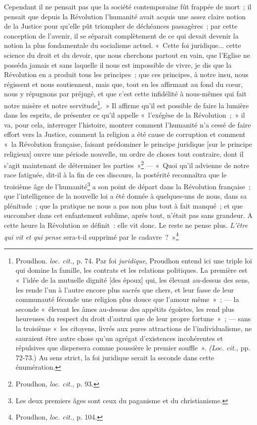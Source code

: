\documentclass[french,twoside]{book} %
\begin{document}
Cependant il ne pensait pas que la société contemporaine fût frappée de mort ; il pensait que depuis la Révolution l’humanité avait acquis une assez claire notion de la Justice pour qu’elle pût triompher de déchéances passagères ; par cette conception de l’avenir, il se séparait complètement de ce qui devait devenir la notion la plus fondamentale du socialisme actuel. « Cette foi juridique... cette science du droit et du devoir, que nous cherchons partout en vain, que l’Eglise ne posséda jamais et sans laquelle il nous est impossible de vivre, je dis que la Révolution en a produit tous les principes ; que ces principes, à notre insu, nous régissent et nous soutiennent, mais que, tout en les affirmant au fond du cœur, nous y  répugnons par préjugé, et que c’est cette infidélité à nous-mêmes qui fait notre misère et notre servitude\footnote{ \noindent Proudhon. \emph{loc. cit.,} p. 74. Par foi \emph{juridique}, Proudhon entend ici une triple loi qui domine la famille, les contrats et les relations politiques. La première est « l’idée de la mutuelle dignité [des époux] qui, les élevant au-dessus des sens, les rende l’un à l’autre encore plus sacrés que chers, et leur fasse de leur communauté féconde une religion plus douce que l’amour même » ; — la seconde « élevant les âmes au-dessus des appétits égoïstes, les rend plus heureuses du respect du droit d’autrui que de leur propre fortune » ; — sans la troisième « les citoyens, livrés aux pures attractions de l’individualisme, ne sauraient être autre chose qu’un agrégat d’existences incohérentes et répulsives que dispersera comme poussière le premier souffle ». \emph{(Loc. cit.,} pp. 72-73.) Au sens strict, la foi juridique serait la seconde dans cette énumération.
 }. » Il affirme qu’il est possible de faire la lumière dans les esprits, de présenter ce qu’il appelle « l’exégèse de la Révolution ; » il va, pour cela, interroger l’histoire, montrer comment l’humanité n’a cessé de faire effort vers la Justice, comment la religion a été cause de corruption et comment « la Révolution française, faisant prédominer le principe juridique [sur le principe religieux] ouvre une période nouvelle, un ordre de choses tout contraire, dont il s’agit maintenant de déterminer les parties »\footnote{ \noindent Proudhon, \emph{loc. cit.,} p. 93.
 } — « Quoi qu’il advienne de notre race fatiguée, dit-il à la fin de ces discours, la postérité reconnaîtra que le troisième âge de l’humanité\footnote{ \noindent Les deux premiers âges sont ceux du paganisme et du christianisme.
 } a son point de départ dans la  Révolution française ; que l’intelligence de la nouvelle loi a été donnée à quelques-uns de nous, dans sa plénitude ; que la pratique ne nous a pas non plus tout à fait manqué ; et que succomber dans cet enfantement sublime, après tout, n’était pas sans grandeur. A cette heure la Révolution se définit : elle vit donc. Le reste ne pense plus. \emph{L’être qui vit et qui pense} sera-t-il supprimé par le cadavre ? »\footnote{ \noindent Proudhon, \emph{loc. cit.,} p. 104.
 }\par
\end{document}
